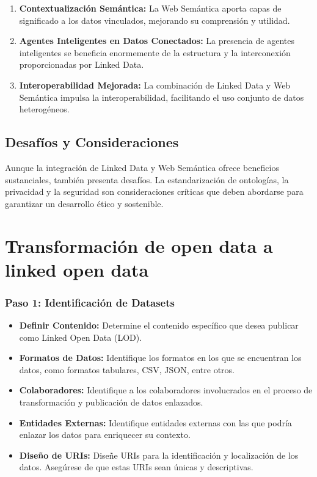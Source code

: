 \documentclass[11pt]{report}
\begin{document}
	\begin{enumerate}
		\item \textbf{Contextualización Semántica:} La Web Semántica aporta capas de significado a los datos vinculados, mejorando su comprensión y utilidad.
		
		\item \textbf{Agentes Inteligentes en Datos Conectados:} La presencia de agentes inteligentes se beneficia enormemente de la estructura y la interconexión proporcionadas por Linked Data.
		
		\item \textbf{Interoperabilidad Mejorada:} La combinación de Linked Data y Web Semántica impulsa la interoperabilidad, facilitando el uso conjunto de datos heterogéneos.
	\end{enumerate}
	
	\section*{Desafíos y Consideraciones}
	
	Aunque la integración de Linked Data y Web Semántica ofrece beneficios sustanciales, también presenta desafíos. La estandarización de ontologías, la privacidad y la seguridad son consideraciones críticas que deben abordarse para garantizar un desarrollo ético y sostenible.
	
	\chapter{Transformación de open data a linked open data}
		  \subsection*{Paso 1: Identificación de Datasets}

		  \begin{itemize}
			\item \textbf{Definir Contenido:} Determine el contenido específico que desea publicar como Linked Open Data (LOD).
			
			\item \textbf{Formatos de Datos:} Identifique los formatos en los que se encuentran los datos, como formatos tabulares, CSV, JSON, entre otros.
			
			\item \textbf{Colaboradores:} Identifique a los colaboradores involucrados en el proceso de transformación y publicación de datos enlazados.
			
			\item \textbf{Entidades Externas:} Identifique entidades externas con las que podría enlazar los datos para enriquecer su contexto.
			
			\item \textbf{Diseño de URIs:} Diseñe URIs para la identificación y localización de los datos. Asegúrese de que estas URIs sean únicas y descriptivas.
		\end{itemize}	
\end{document}
